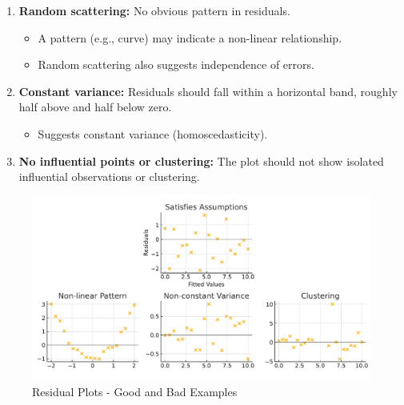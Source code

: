 \begin{enumerate}
    \item \textbf{Random scattering:} No obvious pattern in residuals.
    \begin{itemize}
        \item A pattern (e.g., curve) may indicate a non-linear relationship.
        \item Random scattering also suggests independence of errors.
    \end{itemize}
    
    \item \textbf{Constant variance:} Residuals should fall within a horizontal band, roughly half above and half below zero.
    \begin{itemize}
        \item Suggests constant variance (homoscedasticity).
    \end{itemize}
    
    \item \textbf{No influential points or clustering:} The plot should not show isolated influential observations or clustering.
\end{enumerate}

\begin{figure}[H]
  \centering
  \includegraphics[width=1.0\textwidth]{section16/images/residual_plots.pdf}
  \caption{Residual Plots - Good and Bad Examples}
\end{figure}

